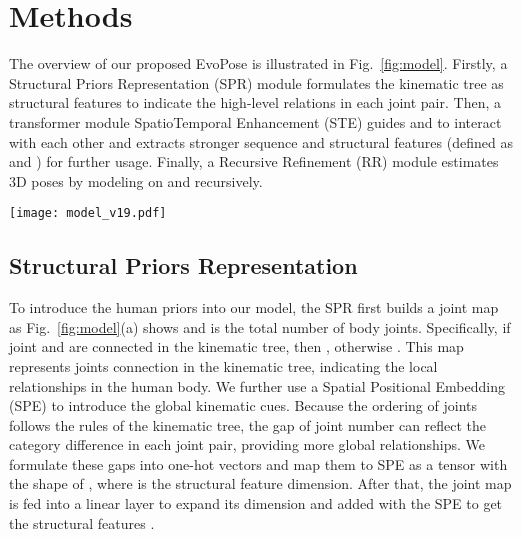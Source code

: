 \documentclass{article}
\begin{document}
\section{Methods}The overview of our proposed EvoPose is illustrated in Fig.~\ref{fig:model}. Firstly, 
a Structural Priors Representation (SPR) module formulates
the kinematic tree as structural features  to indicate the high-level relations in each joint pair. Then, a transformer module SpatioTemporal Enhancement (STE) guides  and  to interact with each other and extracts stronger sequence and structural features (defined as  and ) for further usage. Finally, a Recursive Refinement (RR) module estimates 3D poses by modeling on  and  recursively.\begin{figure*}[ht]
  \setlength{\abovecaptionskip}{0cm}
  \setlength{\belowcaptionskip}{-0.3cm}
  \centering
\centerline{\texttt{[image: model\_v19.pdf]}}
\caption{{\bf (a)} Overview of the proposed EvoPose. Structural Priors Representation (SPR) derives structural features from the kinematic tree. SpatioTemporal Enhancement (STE) models spatiotemporal relations and enhances structural features. {\bf (b)} Overview of STEvo in STE. {\bf (c)} Overview of the Recursive Refinement (RR) which refines the estimated result auto-regressively.}
\label{fig:model}\end{figure*}

\subsection{Structural Priors Representation}To introduce the human priors into our model, the SPR first builds a joint map  as Fig.~\ref{fig:model}(a) shows and  is the total number of body joints. Specifically, if joint  and  are connected in the kinematic tree, then , otherwise . This map represents joints connection in the kinematic tree, indicating the local relationships in the human body. We further use a Spatial Positional Embedding (SPE) to introduce the global kinematic cues. Because the ordering of joints follows the rules of the kinematic tree, the gap of joint number can reflect the category difference in each joint pair, providing more global relationships. We formulate these gaps into one-hot vectors and map them to SPE as a tensor with the shape of , where  is the structural feature dimension. After that, the joint map is fed into a linear layer to expand its dimension and added with the SPE to get the structural features .
\end{document}
